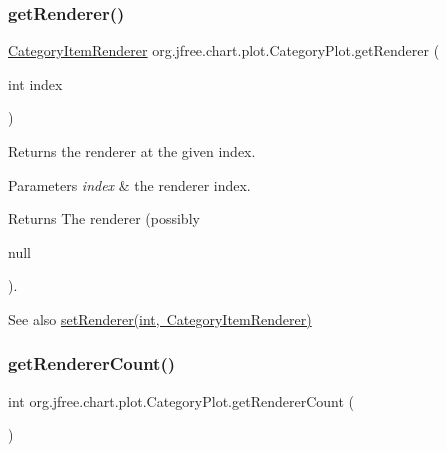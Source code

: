 \subsubsection{\texorpdfstring{get\+Renderer()}{getRenderer()}\hspace{0.1cm}{\footnotesize\ttfamily [2/2]}}
{\footnotesize\ttfamily \mbox{\hyperlink{interfaceorg_1_1jfree_1_1chart_1_1renderer_1_1category_1_1_category_item_renderer}{Category\+Item\+Renderer}} org.\+jfree.\+chart.\+plot.\+Category\+Plot.\+get\+Renderer (\begin{DoxyParamCaption}\item[{int}]{index }\end{DoxyParamCaption})}

Returns the renderer at the given index.


\begin{DoxyParams}{Parameters}
{\em index} & the renderer index.\\
\hline
\end{DoxyParams}
\begin{DoxyReturn}{Returns}
The renderer (possibly
\begin{DoxyCode}
null 
\end{DoxyCode}
 ).
\end{DoxyReturn}
\begin{DoxySeeAlso}{See also}
\mbox{\hyperlink{classorg_1_1jfree_1_1chart_1_1plot_1_1_category_plot_a59619047a04bd5ab557db570e8bb53cb}{set\+Renderer(int, Category\+Item\+Renderer)}} 
\end{DoxySeeAlso}
\mbox{\label{classorg_1_1jfree_1_1chart_1_1plot_1_1_category_plot_ac64a1930a3901a554a67dd1be9ce52e5}} 
\subsubsection{\texorpdfstring{get\+Renderer\+Count()}{getRendererCount()}}
{\footnotesize\ttfamily int org.\+jfree.\+chart.\+plot.\+Category\+Plot.\+get\+Renderer\+Count (\begin{DoxyParamCaption}{ }\end{DoxyParamCaption})}


